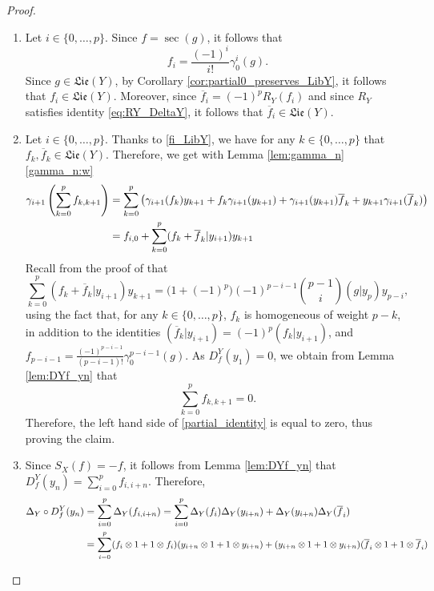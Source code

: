 \documentclass[11pt, a4paper]{amsart}
\numberwithin{equation}{section}
\theoremstyle{definition}
\newcommand{\Lie}{\mathfrak{Lie}}
\begin{document}
\begin{proof}
    \begin{enumerate}[label=(\alph*), leftmargin=*]
        \item Let $i \in \{0, \dots, p\}$. Since $f = \sec(g)$, it follows that
        \[
            f_i = \frac{(-1)^i}{i!} \gamma_0^i(g).
        \]
        Since $g \in \Lie(Y)$, by Corollary \ref{cor:partial0_preserves_LibY}, it follows that $f_i \in \Lie(Y)$. Moreover, since $\overline{f}_i = (-1)^p R_Y(f_i)$ and since $R_Y$ satisfies identity \eqref{eq:RY_DeltaY}, it follows that $\overline{f}_i \in \Lie(Y)$.
        \item Let $i \in \{0, \dots, p\}$. Thanks to \ref{fi_LibY}, we have for any $k \in \{0, \dots, p\}$ that $f_k, \overline{f}_k \in \Lie(Y)$. Therefore, we get with Lemma  \ref{lem:gamma_n}\ref{gamma_n:w}
        \begin{align}
            \gamma_{i+1}\left(\sum_{k=0}^p f_{k,k+1}\right) & = \sum_{k=0}^p \left(\gamma_{i+1}(f_k) y_{k+1} + f_k \gamma_{i+1}(y_{k+1}) + \gamma_{i+1}(y_{k+1}) \overline{f}_k + y_{k+1} \gamma_{i+1}(\overline{f}_k)\right) \notag \\
            & = f_{i,0} + \sum_{k=0}^p (f_k + \overline{f}_k | y_{i+1}) y_{k+1} \label{partial_identity}  
        \end{align}
        Recall from the proof of \cite[Lemma A.4]{Fu11} that
        \[
            \sum_{k=0}^p (f_k + \overline{f}_k | y_{i+1}) y_{k+1} = \big(1+(-1)^p\big)(-1)^{p-i-1} \binom{p-1}{i} (g | y_p) y_{p-i}, 
        \]
        using the fact that, for any $k \in \{0, \dots, p\}$, $f_k$ is homogeneous of weight $p-k$, in addition to the identities $(\overline{f}_k | y_{i+1}) = (-1)^p (f_k | y_{i+1})$, and $f_{p-i-1} = \frac{(-1)^{p-i-1}}{(p-i-1)!} \gamma_0^{p-i-1}(g)$. \newline
        As $D_f^Y(y_1)=0$, we obtain from Lemma \ref{lem:DYf_yn} that
        \[
            \sum_{k=0}^p f_{k,k+1} = 0.
        \]
        Therefore, the left hand side of \eqref{partial_identity} is equal to zero, thus proving the claim.
        \item Since $S_X(f) = -f$, it follows from Lemma \ref{lem:DYf_yn} that $\displaystyle D_f^Y(y_n) = \sum_{i=0}^p f_{i,i+n}$. Therefore,
        \begin{align*}
            \Delta_Y \circ D^Y_f(y_n) & = \sum_{i=0}^p \Delta_Y(f_{i,i+n}) = \sum_{i=0}^p \Delta_Y(f_i) \Delta_Y(y_{i+n}) + \Delta_Y(y_{i+n}) \Delta_Y(\overline{f}_i) \\
            & = \mbox{\small$\displaystyle\sum_{i=0}^p (f_i \otimes 1 + 1 \otimes f_i) (y_{i+n} \otimes 1 + 1 \otimes y_{i+n}) + (y_{i+n} \otimes 1 + 1 \otimes y_{i+n}) (\overline{f}_i \otimes 1 + 1 \otimes \overline{f}_i)$} \\

\end{align*}
\end{enumerate}
\end{proof}
\end{document}
